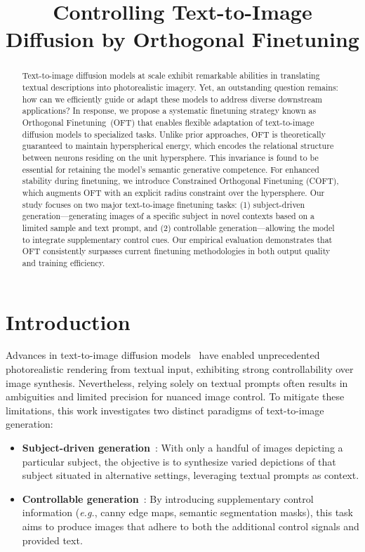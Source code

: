 \title{Controlling Text-to-Image Diffusion by Orthogonal Finetuning}

\begin{abstract}
Text-to-image diffusion models at scale exhibit remarkable abilities in translating textual descriptions into photorealistic imagery. Yet, an outstanding question remains: how can we efficiently guide or adapt these models to address diverse downstream applications? In response, we propose a systematic finetuning strategy known as Orthogonal Finetuning~(OFT) that enables flexible adaptation of text-to-image diffusion models to specialized tasks. Unlike prior approaches, OFT is theoretically guaranteed to maintain hyperspherical energy, which encodes the relational structure between neurons residing on the unit hypersphere. This invariance is found to be essential for retaining the model's semantic generative competence. For enhanced stability during finetuning, we introduce Constrained Orthogonal Finetuning (COFT), which augments OFT with an explicit radius constraint over the hypersphere. Our study focuses on two major text-to-image finetuning tasks: (1) subject-driven generation—generating images of a specific subject in novel contexts based on a limited sample and text prompt, and (2) controllable generation—allowing the model to integrate supplementary control cues. Our empirical evaluation demonstrates that OFT consistently surpasses current finetuning methodologies in both output quality and training efficiency.
\end{abstract}

\section{Introduction}

Advances in text-to-image diffusion models~\cite{saharia2022photorealistic,ramesh2022hierarchical,rombach2022high} have enabled unprecedented photorealistic rendering from textual input, exhibiting strong controllability over image synthesis. Nevertheless, relying solely on textual prompts often results in ambiguities and limited precision for nuanced image control. To mitigate these limitations, this work investigates two distinct paradigms of text-to-image generation:

\begin{itemize}[leftmargin=*,nosep]

    \item \textbf{Subject-driven generation}~\cite{ruiz2023dreambooth}: With only a handful of images depicting a particular subject, the objective is to synthesize varied depictions of that subject situated in alternative settings, leveraging textual prompts as context.
    \item \textbf{Controllable generation}~\cite{zhang2023adding,mou2023t2i}: By introducing supplementary control information (\emph{e.g.}, canny edge maps, semantic segmentation masks), this task aims to produce images that adhere to both the additional control signals and provided text.
\end{itemize}


